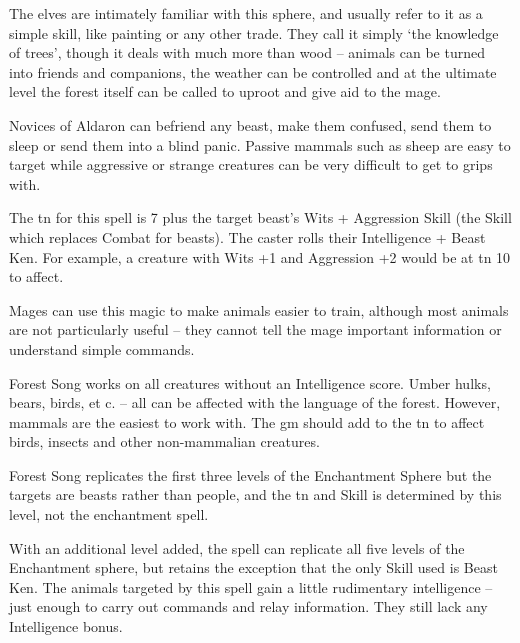 
\begin{multicols}{2}

\noindent
The elves are intimately familiar with this sphere, and usually refer to it as a simple skill, like painting or any other trade. They call it simply `the knowledge of trees', though it deals with much more than wood -- animals can be turned into friends and companions, the weather can be controlled and at the ultimate level the forest itself can be called to uproot and give aid to the mage.

\spelllevel

\noindent
Novices of Aldaron can befriend any beast, make them confused, send them to sleep or send them into a blind panic.
Passive mammals such as sheep are easy to target while aggressive or strange creatures can be very difficult to get to grips with.

The \gls{tn} for this spell is 7 plus the target beast's Wits + Aggression Skill (the Skill which replaces Combat for beasts). The caster rolls their Intelligence + Beast Ken. For example, a creature with Wits +1 and Aggression +2 would be at \gls{tn} 10 to affect.

Mages can use this magic to make animals easier to train, although most animals are not particularly useful -- they cannot tell the mage important information or understand simple commands.

Forest Song works on all creatures without an Intelligence score.
Umber hulks, bears, birds, et c. -- all can be affected with the language of the forest.
However, mammals are the easiest to work with.
The \gls{gm} should add to the \gls{tn} to affect birds, insects and other non-mammalian creatures.

Forest Song replicates the first three levels of the Enchantment Sphere but the targets are beasts rather than people, and the \gls{tn} and Skill is determined by this level, not the enchantment spell.


With an additional level added, the spell can replicate all five levels of the Enchantment sphere, but retains the exception that the only Skill used is Beast Ken.
The animals targeted by this spell gain a little rudimentary intelligence -- just enough to carry out commands and relay information.
They still lack any Intelligence bonus.

\\
\label{light}


\end{multicols}

